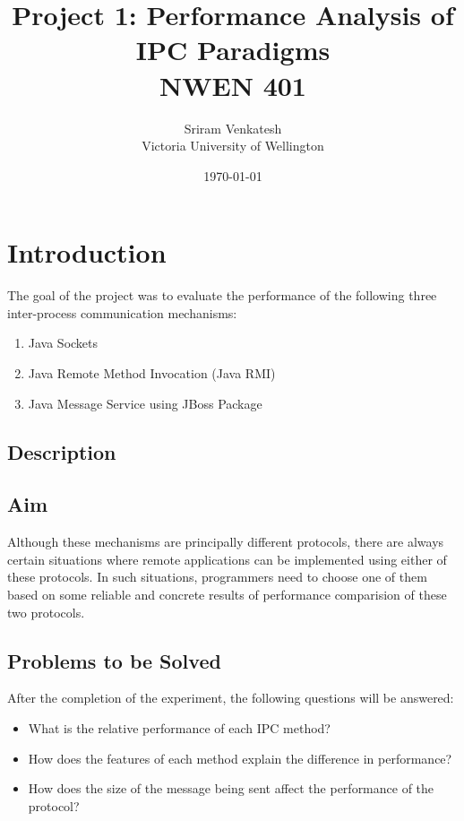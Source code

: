 \documentclass{article}
\title{Project 1: Performance Analysis of IPC Paradigms \\ NWEN 401} %
\author{Sriram Venkatesh \\ Victoria University of Wellington} %
\date{\today} %
\begin{document}
\maketitle %





\section{Introduction}
The goal of the project was to evaluate the performance of the following three inter-process communication mechanisms:

\begin{enumerate}
	\item Java Sockets
	\item Java Remote Method Invocation (Java RMI)
	\item Java Message Service using JBoss Package
\end{enumerate}

\subsection{Description}


\subsection{Aim}
Although these mechanisms are principally different protocols, there are always certain situations where remote applications can be implemented using either of these protocols. In such situations, programmers need to choose one of them based on some reliable and concrete results of performance comparision of these two protocols. \\


\subsection{Problems to be Solved}
After the completion of the experiment, the following questions will be answered:
\begin{itemize}
	\item What is the relative performance of each IPC method?
	\item How does the features of each method explain the difference in performance?	
	\item How does the size of the message being sent affect the performance of the protocol?
\end{itemize}
\end{document}
